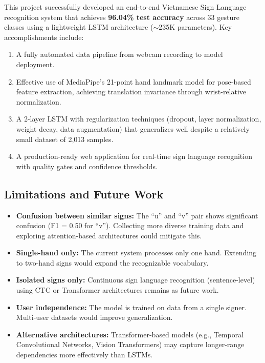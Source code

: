 \documentclass[12pt, a4paper]{article}
\begin{document}
This project successfully developed an end-to-end Vietnamese Sign Language recognition system that achieves \textbf{96.04\% test accuracy} across 33 gesture classes using a lightweight LSTM architecture ($\sim$235K parameters). Key accomplishments include:

\begin{enumerate}
    \item A fully automated data pipeline from webcam recording to model deployment.
    \item Effective use of MediaPipe's 21-point hand landmark model for pose-based feature extraction, achieving translation invariance through wrist-relative normalization.
    \item A 2-layer LSTM with regularization techniques (dropout, layer normalization, weight decay, data augmentation) that generalizes well despite a relatively small dataset of 2{,}013 samples.
    \item A production-ready web application for real-time sign language recognition with quality gates and confidence thresholds.
\end{enumerate}

\subsection{Limitations and Future Work}

\begin{itemize}
    \item \textbf{Confusion between similar signs:} The ``u'' and ``v'' pair shows significant confusion (F1 = 0.50 for ``v''). Collecting more diverse training data and exploring attention-based architectures could mitigate this.
    \item \textbf{Single-hand only:} The current system processes only one hand. Extending to two-hand signs would expand the recognizable vocabulary.
    \item \textbf{Isolated signs only:} Continuous sign language recognition (sentence-level) using CTC or Transformer architectures remains as future work.
    \item \textbf{User independence:} The model is trained on data from a single signer. Multi-user datasets would improve generalization.
    \item \textbf{Alternative architectures:} Transformer-based models (e.g., Temporal Convolutional Networks, Vision Transformers) may capture longer-range dependencies more effectively than LSTMs.
\end{itemize}
\end{document}
